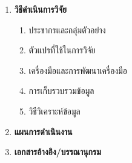 \begin{titlepage}
\begin{enumerate}
    \item\textbf{วิธีดำเนินการวิจัย}
    
    \begin{enumerate}

      \item ประชากรและกลุ่มตัวอย่าง
      
      \lipsum[1-1]

      \item ตัวแปรที่ใช้ในการวิจัย
      
      \lipsum[1-1]

      \item เครื่องมือและการพัฒนาเครื่องมือ
      
      \lipsum[1-1]

      \item การเก็บรวบรวมข้อมูล
      
      \lipsum[1-1]

      \item วิธีวิเคราะห์ข้อมูล  
      
      \lipsum[1-1]

    \end{enumerate}
    \item\textbf{แผนการดำเนินงาน}
    
    \lipsum[1-3]

    \item\textbf{เอกสารอ้างอิง/บรรณานุกรม}
    
    \lipsum[1-4]

  \end{enumerate}


           


           
           
           
           
\end{titlepage}